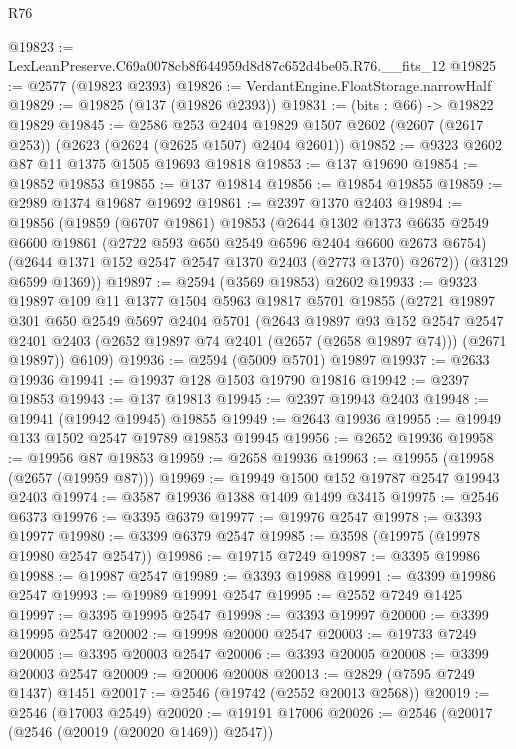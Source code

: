 \begin{lexlean}{R76}
\begin{coremodule}
@19823 := LexLeanPreserve.C69a0078cb8f644959d8d87c652d4be05.R76.__fits_12
@19825 := @2577 (@19823 @2393)
@19826 := VerdantEngine.FloatStorage.narrowHalf
@19829 := @19825 (@137 (@19826 @2393))
@19831 := (bits : @66) -> @19822 @19829
@19845 := @2586
    @253
    @2404
    @19829
    @1507
    @2602
    (@2607 (@2617 @253))
    (@2623 (@2624 (@2625 @1507) @2404 @2601))
@19852 := @9323 @2602 @87 @11 @1375 @1505 @19693 @19818
@19853 := @137 @19690
@19854 := @19852 @19853
@19855 := @137 @19814
@19856 := @19854 @19855
@19859 := @2989 @1374 @19687 @19692
@19861 := @2397 @1370 @2403
@19894 := @19856
    (@19859
      (@6707 @19861)
      @19853
      (@2644
        @1302
        @1373
        @6635
        @2549
        @6600
        @19861
        (@2722 @593 @650 @2549 @6596 @2404 @6600 @2673 @6754)
        (@2644 @1371 @152 @2547 @2547 @1370 @2403 (@2773 @1370) @2672))
      (@3129 @6599 @1369))
@19897 := @2594 (@3569 @19853) @2602
@19933 := @9323
    @19897
    @109
    @11
    @1377
    @1504
    @5963
    @19817
    @5701
    @19855
    (@2721
      @19897
      @301
      @650
      @2549
      @5697
      @2404
      @5701
      (@2643
        @19897
        @93
        @152
        @2547
        @2547
        @2401
        @2403
        (@2652 @19897 @74 @2401 (@2657 (@2658 @19897 @74)))
        (@2671 @19897))
      @6109)
@19936 := @2594 (@5009 @5701) @19897
@19937 := @2633 @19936
@19941 := @19937 @128 @1503 @19790 @19816
@19942 := @2397 @19853
@19943 := @137 @19813
@19945 := @2397 @19943 @2403
@19948 := @19941 (@19942 @19945) @19855
@19949 := @2643 @19936
@19955 := @19949 @133 @1502 @2547 @19789 @19853 @19945
@19956 := @2652 @19936
@19958 := @19956 @87 @19853
@19959 := @2658 @19936
@19963 := @19955 (@19958 (@2657 (@19959 @87)))
@19969 := @19949 @1500 @152 @19787 @2547 @19943 @2403
@19974 := @3587 @19936 @1388 @1409 @1499 @3415
@19975 := @2546 @6373
@19976 := @3395 @6379
@19977 := @19976 @2547
@19978 := @3393 @19977
@19980 := @3399 @6379 @2547
@19985 := @3598 (@19975 (@19978 @19980 @2547 @2547))
@19986 := @19715 @7249
@19987 := @3395 @19986
@19988 := @19987 @2547
@19989 := @3393 @19988
@19991 := @3399 @19986 @2547
@19993 := @19989 @19991 @2547
@19995 := @2552 @7249 @1425
@19997 := @3395 @19995 @2547
@19998 := @3393 @19997
@20000 := @3399 @19995 @2547
@20002 := @19998 @20000 @2547
@20003 := @19733 @7249
@20005 := @3395 @20003 @2547
@20006 := @3393 @20005
@20008 := @3399 @20003 @2547
@20009 := @20006 @20008
@20013 := @2829 (@7595 @7249 @1437) @1451
@20017 := @2546 (@19742 (@2552 @20013 @2568))
@20019 := @2546 (@17003 @2549)
@20020 := @19191 @17006
@20026 := @2546 (@20017 (@2546 (@20019 (@20020 @1469)) @2547))

\end{coremodule}
\end{lexlean}
